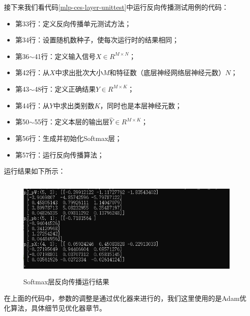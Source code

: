 \documentclass[UTF8]{article}
\begin{document}
接下来我们看代码\ref{mlp-ces-layer-unittest}中运行反向传播测试用例的代码：
\begin{itemize}
\item 第33行：定义反向传播单元测试方法；
\item 第34行：设置随机数种子，使每次运行时的结果相同；
\item 第36$\sim$41行：定义输入信号$X \in R^{M \times N}$；
\item 第42行：从$X$中求出批次大小$M$和特征数（底层神经网络层神经元数）$N$；
\item 第43$\sim$48行：定义正确结果$Y \in R^{M \times K}$；
\item 第44行：从$Y$中求出类别数$K$，同时也是本层神经元数；
\item 第50$\sim$55行：定义本层的输出层$\hat{Y} \in R^{M \times K}$；
\item 第56行：生成并初始化Softmax层；
\item 第57行：运行反向传播算法；
\end{itemize}
运行结果如下所示：
\begin{figure}[H]
	\caption{Softmax层反向传播运行结果}
	\label{f000068}
	\centering
	\includegraphics[height=5cm]{images/f000068}
\end{figure}
在上面的代码中，参数的调整是通过优化器来进行的，我们这里使用的是Adam优化算法，具体细节见优化器章节。
\end{document}
